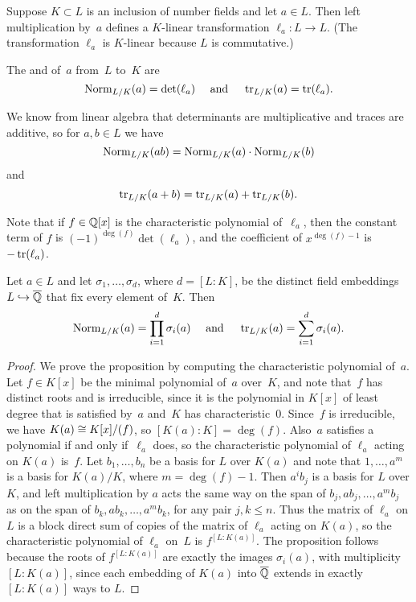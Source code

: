 Suppose $K\subset L$ is an inclusion of number fields and let $a\in
L$.  Then left multiplication by~$a$ defines a $K$-linear
transformation $\ell_a:L\to L$.  (The transformation $\ell_a$ is
$K$-linear because $L$ is commutative.)

\begin{definition}\label{defn:normtrace}
The  and  of~$a$ from~$L$ to~$K$ are
$$\operatorname{Norm}_{L/K}(a)=\det(\ell_a) \quad\text{ and }\quad
 \operatorname{tr}_{L/K}(a)=\operatorname{tr}(\ell_a).$$
\end{definition}
We know from linear algebra that 
determinants are multiplicative
and traces are additive, so for $a,b\in L$ we have
$$\operatorname{Norm}_{L/K}(ab) = \operatorname{Norm}_{L/K}(a)\cdot \operatorname{Norm}_{L/K}(b)$$
and
$$\operatorname{tr}_{L/K}(a+b) = \operatorname{tr}_{L/K}(a) + \operatorname{tr}_{L/K}(b).$$

Note that if $f\in\mathbb{Q}[x]$ is the characteristic polynomial of~$\ell_a$,
then the constant term of $f$ is $(-1)^{\deg(f)}\det(\ell_a)$, and the
coefficient of $x^{\deg(f)-1}$ is $-\operatorname{tr}(\ell_a)$.

\begin{proposition}\label{prop:normtracesigma}
Let $a\in L$ and let $\sigma_1,\ldots, \sigma_d$, where $d=[L:K]$, be
the distinct field embeddings $L\hookrightarrow \overline{\mathbb{Q}}$ that fix every element
of~$K$.  Then
$$
\operatorname{Norm}_{L/K}(a) = \prod_{i=1}^d \sigma_i(a)
\quad\text{ and }\quad
\operatorname{tr}_{L/K}(a) = \sum_{i=1}^d \sigma_i(a).
$$
\end{proposition}
\begin{proof}
  We prove the proposition by computing the characteristic
  polynomial of~$a$.  Let $f\in K[x]$ be the minimal polynomial
  of~$a$ over~$K$, and note that~$f$ has distinct roots and is
  irreducible, since it is the polynomial in $K[x]$ of least degree
  that is satisfied by~$a$ and~$K$ has characteristic~$0$.  Since~$f$
  is irreducible, we have $K(a) \cong K[x]/(f)$, so $[K(a):K]=\deg(f)$.
  Also~$a$ satisfies a polynomial if and only if~$\ell_a$ does, so the
  characteristic polynomial of $\ell_a$ acting on $K(a)$ is~$f$.  Let
  $b_1,\ldots,b_n$ be a basis for $L$ over $K(a)$ and note that
  $1,\ldots, a^m$ is a basis for $K(a)/K$, where $m=\deg(f)-1$.  Then
  $a^i b_j$ is a basis for $L$ over $K$, and left multiplication by
  $a$ acts the same way on the span of $b_j, a b_j, \ldots, a^m b_j$
  as on the span of $b_k, a b_k, \ldots, a^m b_k$, for any pair $j,
  k\leq n$.  Thus the matrix of $\ell_a$ on $L$ is a block direct sum
  of copies of the matrix of $\ell_a$ acting on $K(a)$, so the
  characteristic polynomial of $\ell_a$ on~$L$ is $f^{[L:K(a)]}$.  The
  proposition follows because the roots of $f^{[L:K(a)]}$ are exactly
  the images $\sigma_i(a)$, with multiplicity $[L:K(a)]$, since each
  embedding of $K(a)$ into $\overline{\mathbb{Q}}$ extends in exactly $[L:K(a)]$ ways
  to $L$.
\end{proof}

